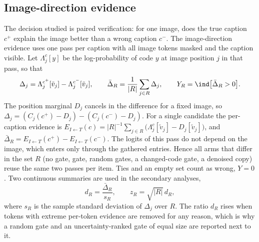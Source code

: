 \subsection{Image-direction evidence}\label{ssec:evidence}
The decision studied is paired verification: for one image, does the true caption $c^+$ explain the image better than a wrong
caption $c^-$.
The image-direction evidence uses one pass per caption with all image tokens masked and the caption visible.
Let $\Lambda^c_j[y]$ be the log-probability of code $y$ at image position $j$ in that pass, so that
\begin{equation}
\Delta_j=\Lambda^{c^+}_j[\tilde v_j]-\Lambda^{c^-}_j[\tilde v_j],\qquad
\bar\Delta_R=\frac1{|R|}\sum_{j\in R}\Delta_j,\qquad
Y_R=\ind\big[\bar\Delta_R>0\big].
\label{eq:delta}
\end{equation}
The position marginal $D_j$ cancels in the difference for a fixed image, so $\Delta_j=(C_j(c^+)-D_j)-(C_j(c^-)-D_j)$.
For a single candidate the per-caption evidence is $E_{I\leftarrow T}(c)=|R|^{-1}\sum_{j\in R}\big(\Lambda^{c}_j[\tilde v_j]-D_j[\tilde v_j]\big)$, and
$\bar\Delta_R=E_{I\leftarrow T}(c^+)-E_{I\leftarrow T}(c^-)$.
The logits of this pass do not depend on the image, which enters only through the gathered entries.
Hence all arms that differ in the set $R$ (no gate, gate, random gates, a changed-code gate, a denoised copy) reuse the same two
passes per item.
Ties and an empty set count as wrong, $Y=0$.
Two continuous summaries are used in the secondary analyses,
\begin{equation}
d_R=\frac{\bar\Delta_R}{s_R},\qquad z_R=\sqrt{|R|}\,d_R,
\label{eq:dz}
\end{equation}
where $s_R$ is the sample standard deviation of $\Delta_j$ over $R$.
The ratio $d_R$ rises when tokens with extreme per-token evidence are removed for any reason, which is why a random gate and
an uncertainty-ranked gate of equal size are reported next to it.

\begin{algorithm}[t]
\caption{\textsc{ImageEvidence} (GATE-M; uses Algorithms~\ref{alg:maskedscore} and~\ref{alg:gate_set})}\label{alg:evidence}
\end{algorithm}


